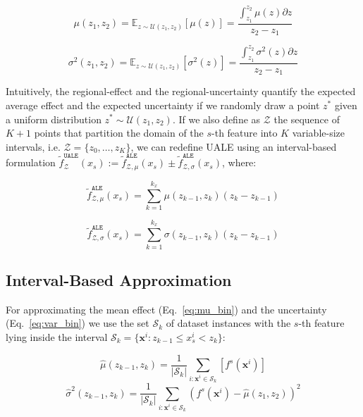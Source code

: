 \documentclass[twoside]{article}
\newcommand{\dfdx}{f^s}
\begin{document}
\begin{equation}
  \label{eq:mu_bin}
    \mu(z_1, z_2) = \mathbb{E}_{z \sim \mathcal{U}(z_1,z_2)} [\mu(z)]
    = \frac{\int_{z_1}^{z_2} \mu(z) \partial z}{z_2 - z_1}
\end{equation}

\begin{equation}
  \label{eq:var_bin}
  \sigma^2(z_1, z_2) = \mathbb{E}_{z \sim \mathcal{U}(z_1,z_2)} [\sigma^2(z)] =  \frac{\int_{z_1}^{z_2} \sigma^2(z)  \partial z}{z_2 - z_1}
\end{equation}

%
Intuitively, the regional-effect and the regional-uncertainty quantify
the expected average effect and the expected uncertainty if we
randomly draw a point \(z^*\) given a uniform distribution
\(z^* \sim \mathcal{U}(z_1, z_2)\). If we also define as
\(\mathcal{Z}\) the sequence of \(K+1\) points that partition the
domain of the \(s\)-th feature into \(K\) variable-size intervals,
i.e.  \(\mathcal{Z} = \{z_0, \ldots, z_K\}\), we can redefine UALE
using an interval-based formulation
\(\tilde{f}^{\mathtt{UALE}}_{\mathcal{Z}}(x_s):= \tilde{f}^{\mathtt{ALE}}_{\mathcal{Z}, \mu}(x_s)
\pm \tilde{f}^{\mathtt{ALE}}_{\mathcal{Z}, \sigma}(x_s)\), where:

\begin{equation}
  \label{eq:ALE_2}
  \tilde{f}^{\mathtt{ALE}}_{\mathcal{Z}, \mu}(x_s) = \sum_{k=1}^{k_x} \mu(z_{k-1}, z_k) (z_k - z_{k-1})
\end{equation}

\begin{equation}
  \label{eq:ALE_accumulated_var}
  \tilde{f}^{\mathtt{ALE}}_{\mathcal{Z}, \sigma}(x_s) =  \sum_{k=1}^{k_x} \sigma(z_{k-1}, z_k) (z_k - z_{k-1})
\end{equation}
%

\subsection{Interval-Based Approximation}
\label{sec:UALE-approximation}

For approximating the mean effect (Eq.~\eqref{eq:mu_bin}) and the
uncertainty (Eq.~\eqref{eq:var_bin}) we use the set \(\mathcal{S}_k\)
of dataset instances with the \(s\)-th feature lying inside the
interval
\( \mathcal{S}_k= \{ \mathbf{x}^i : z_{k-1} \leq x^i_s < z_k \} \):

\begin{equation}
  \label{eq:2}
  \hat{\mu}(z_{k-1}, z_k) = \frac{1}{|\mathcal{S}_k|}
  \sum_{i:\mathbf{x}^i \in \mathcal{S}_k} \left [ \dfdx(\mathbf{x}^i)
  \right ]
\end{equation}
%
\begin{equation}
  \label{eq:3}
  \hat{\sigma}^2(z_{k-1}, z_k) = \frac{1}{|\mathcal{S}_k|}
\sum_{i:\mathbf{x}^i \in \mathcal{S}_k} \left ( \dfdx(\mathbf{x}^i) -
  \hat{\mu}(z_1, z_2) \right )^2
\end{equation}
\end{document}
